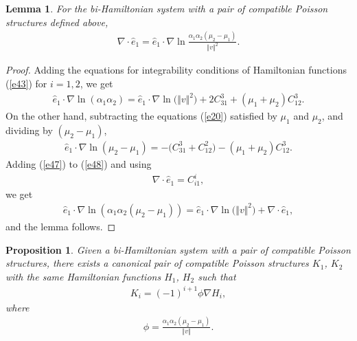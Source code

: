\documentclass[10pt,a4paper]{amsart}
\numberwithin{equation}{section}
\newtheorem{Lemma}[Theorem]{Lemma}
\newtheorem{Proposition}[Theorem]{Proposition}
 { \theoremstyle{definition}
\newtheorem{Definition}[Theorem]{Definition} }
\begin{document}
\begin{Lemma}\label{lemma1}
For the bi-Hamiltonian system with a pair of compatible Poisson structures defined above,
\begin{gather*}
\nabla \cdot \widehat{e}_{1}=\widehat{e}_{1}\cdot \nabla \ln \frac{\alpha_{1}\alpha _{2}( \mu _{2}-\mu _{1}) }{\Vert v\Vert ^{2}}.
\end{gather*}
\end{Lemma}

\begin{proof}
Adding the equations for integrability conditions of Hamiltonian functions (\ref{e43}) for $i=1,2$, we get
\begin{gather}
\widehat{e}_{1}\cdot \nabla \ln ( \alpha _{1}\alpha _{2}) =\widehat{e}_{1}\cdot \nabla \ln \big( \Vert v\Vert^{2}\big)+2C_{31}^{3}+(\mu _{1}+\mu _{2}) C_{12}^{3}.\label{e47}
\end{gather}
On the other hand, subtracting the equations (\ref{e20}) satisf\/ied by $\mu _{1}$ and $\mu _{2}$, and dividing by $( \mu_{2}-\mu_{1}) $,
\begin{gather}
\widehat{e}_{1}\cdot \nabla \ln (\mu _{2}-\mu _{1}) =-\big(C_{31}^{3}+C_{12}^{2}\big) -(\mu _{1}+\mu _{2}) C_{12}^{3} . \label{e48}
\end{gather}
Adding (\ref{e47}) to (\ref{e48}) and using
\begin{gather*}
\nabla \cdot \widehat{e}_{1}=C_{i1}^{i},
\end{gather*}
we get
\begin{gather*}
\widehat{e}_{1}\cdot \nabla \ln ( \alpha _{1}\alpha _{2} (\mu_{2}-\mu _{1}) ) =\widehat{e}_{1}\cdot \nabla \ln
\big(\Vert v\Vert ^{2}\big) +\nabla \cdot \widehat{e}_{1},
\end{gather*}
and the lemma follows.
\end{proof}

\begin{Proposition}\label{proposition4} Given a bi-Hamiltonian system with a pair of compatible Poisson structures, there exists a canonical pair of compatible Poisson structures $K_{1}$, $K_{2}$ with the same Hamiltonian functions $H_{1}$, $H_{2}$ such that
\begin{gather*}
K_{i}=(-1)^{i+1}\phi \nabla H_{i},
\end{gather*}
where
\begin{gather*}
\phi =\frac{\alpha _{1}\alpha _{2}(\mu _{2}-\mu _{1}) }{\Vert v\Vert }.
\end{gather*}
\end{Proposition}
\end{document}
